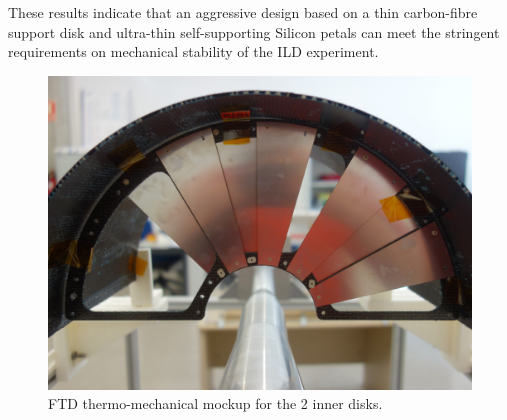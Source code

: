 These results indicate that an aggressive design based on a thin carbon-fibre
support disk and ultra-thin self-supporting Silicon petals can meet the 
stringent requirements on mechanical stability of the ILD experiment.
\begin{figure}[t!]
\centering
\includegraphics[width=0.6\hsize]{Detector/fig/FTD_mockup.jpg}
\caption{FTD thermo-mechanical mockup for the 2 inner disks.}
\label{fig:det:FTD_mockup}
\end{figure}